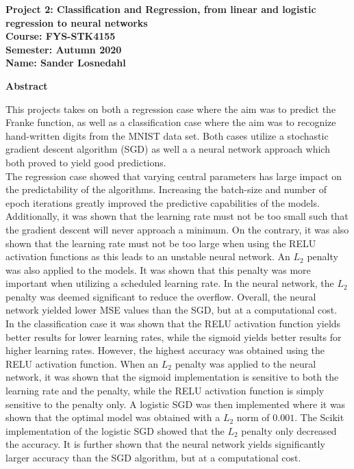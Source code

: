 \documentclass[12pt,a4paper]{article}
\begin{document}
\begin{center}
\LARGE{\textbf{Project 2: Classification and Regression, from linear and logistic regression to neural networks}}
\\
\large{\textbf{Course: FYS-STK4155}}
\\
\large{\textbf{Semester: Autumn 2020}}
\\
\large{\textbf{Name: Sander Losnedahl}}
\end{center}

\begin{center}
\Large{\textbf{Abstract}}
\end{center}

\noindent This projects takes on both a regression case where the aim was to predict the Franke function, as well as a classification case where the aim was to recognize hand-written digits from the MNIST data set. Both cases utilize a stochastic gradient descent algorithm (SGD) as well a a neural network approach which both proved to yield good predictions.
\\
The regression case showed that varying central parameters has large impact on the predictability of the algorithms. Increasing the batch-size and number of epoch iterations greatly improved the predictive capabilities of the models. Additionally, it was shown that the learning rate must not be too small such that the gradient descent will never approach a minimum. On the contrary, it was also shown that the learning rate must not be too large when using the RELU activation functions as this leads to an unstable neural network. An $L_2$ penalty was also applied to the models. It was shown that this penalty was more important when utilizing a scheduled learning rate. In the neural network, the $L_2$ penalty was deemed significant to reduce the overflow. Overall, the neural network yielded lower MSE values than the SGD, but at a computational cost. 
\\
In the classification case it was shown that the RELU activation function yields better results for lower learning rates, while the sigmoid yields better results for higher learning rates. However, the highest accuracy was obtained using the RELU activation function. When an $L_2$ penalty was applied to the neural network, it was shown that the sigmoid implementation is sensitive to both the learning rate and the penalty, while the RELU activation function is simply sensitive to the penalty only. A logistic SGD was then implemented where it was shown that the optimal model was obtained with a $L_2$ norm of $0.001$. The Scikit implementation of the logistic SGD showed that the $L_2$ penalty only decreased the accuracy. It is further shown that the neural network yields significantly larger accuracy than the SGD algorithm, but at a computational cost.
\end{document}
